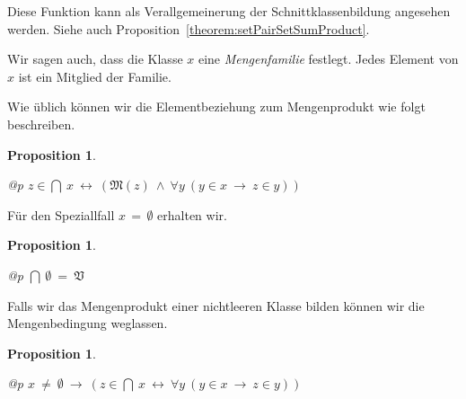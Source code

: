 \documentclass[a4paper,german,10pt,twoside]{book}
\newtheorem{prop}[thm]{Proposition}
\theoremstyle{definition}
\theoremstyle{remark}
\begin{document}
Diese Funktion kann als Verallgemeinerung der Schnittklassenbildung angesehen werden.
Siehe auch Proposition~\ref{theorem:setPairSetSumProduct}.

\par
Wir sagen auch, dass die Klasse $x$ eine \emph{Mengenfamilie}
festlegt. Jedes Element von $x$ ist ein Mitglied der Familie.


\par
Wie {\"u}blich k{\"o}nnen wir die Elementbeziehung zum Mengenprodukt wie folgt beschreiben.

\begin{prop}
\label{theorem:setProductMembership} \hypertarget{theorem:setProductMembership}{}
\mbox{}
\begin{longtable}{{@{\extracolsep{\fill}}p{\linewidth}}}
\centering $z \in \bigcap \ x\ \leftrightarrow \ (\mathfrak{M}(z)\ \land \ \forall y\ (y \in x\ \rightarrow \ z \in y))$
\end{longtable}

\end{prop}




\par
F{\"u}r den Speziallfall $x\,=\,\emptyset$ erhalten wir.

\begin{prop}
\label{theorem:emptySetProduct} \hypertarget{theorem:emptySetProduct}{}
\mbox{}
\begin{longtable}{{@{\extracolsep{\fill}}p{\linewidth}}}
\centering $\bigcap \ \emptyset \ =  \ \mathfrak{V}$
\end{longtable}

\end{prop}




\par
Falls wir das Mengenprodukt einer nichtleeren Klasse bilden
k{\"o}nnen wir die Mengenbedingung weglassen.

\begin{prop}
\label{theorem:nonEmptySetProductMembership} \hypertarget{theorem:nonEmptySetProductMembership}{}
\mbox{}
\begin{longtable}{{@{\extracolsep{\fill}}p{\linewidth}}}
\centering $x \ \neq \ \emptyset\ \rightarrow \ (z \in \bigcap \ x\ \leftrightarrow \ \forall y\ (y \in x\ \rightarrow \ z \in y))$
\end{longtable}

\end{prop}
\end{document}
